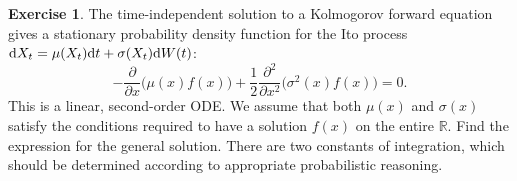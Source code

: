 \documentclass[12pt]{article}
\def\rd{{\rm d}}
\theoremstyle{definition}
\newtheorem{exer}{Exercise}
\theoremstyle{remark}
\begin{document}
\newpage

\begin{exer}
 The time-independent solution to a
Kolmogorov forward equation gives a stationary probability
density function for the Ito process
$\rd X_t = \mu(X_t)\rd t + \sigma(X_t)\rd W(t)$:
\[
        -\frac{\partial}{\partial x}\Big( \mu(x) f(x)\Big)
       + \frac{1}{2}\frac{\partial^2}{\partial x^2} 
         \Big( \sigma^2(x) f(x) \Big) = 0. 
\]
This is a linear, second-order ODE.  We assume that both
$\mu(x)$ and $\sigma(x)$ satisfy the conditions required
to have a solution $f(x)$ on the entire $\mathbb{R}$.  
Find the expression for the general solution.  
There are two constants of integration, which should be 
determined according to appropriate probabilistic
reasoning.
\end{exer}
\end{document}
